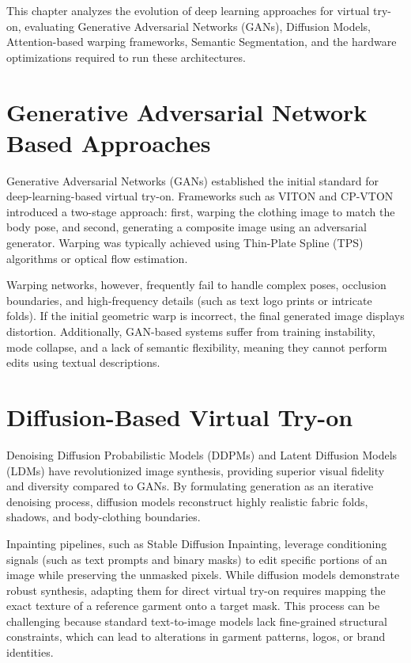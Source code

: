 \documentclass[12pt, a4paper]{report}
\begin{document}
This chapter analyzes the evolution of deep learning approaches for virtual try-on, evaluating Generative Adversarial Networks (GANs), Diffusion Models, Attention-based warping frameworks, Semantic Segmentation, and the hardware optimizations required to run these architectures.

\section{Generative Adversarial Network Based Approaches}

Generative Adversarial Networks (GANs) established the initial standard for deep-learning-based virtual try-on. Frameworks such as VITON and CP-VTON introduced a two-stage approach: first, warping the clothing image to match the body pose, and second, generating a composite image using an adversarial generator. Warping was typically achieved using Thin-Plate Spline (TPS) algorithms or optical flow estimation.

Warping networks, however, frequently fail to handle complex poses, occlusion boundaries, and high-frequency details (such as text logo prints or intricate folds). If the initial geometric warp is incorrect, the final generated image displays distortion. Additionally, GAN-based systems suffer from training instability, mode collapse, and a lack of semantic flexibility, meaning they cannot perform edits using textual descriptions.

\section{Diffusion-Based Virtual Try-on}

Denoising Diffusion Probabilistic Models (DDPMs) and Latent Diffusion Models (LDMs) have revolutionized image synthesis, providing superior visual fidelity and diversity compared to GANs. By formulating generation as an iterative denoising process, diffusion models reconstruct highly realistic fabric folds, shadows, and body-clothing boundaries.

Inpainting pipelines, such as Stable Diffusion Inpainting, leverage conditioning signals (such as text prompts and binary masks) to edit specific portions of an image while preserving the unmasked pixels. While diffusion models demonstrate robust synthesis, adapting them for direct virtual try-on requires mapping the exact texture of a reference garment onto a target mask. This process can be challenging because standard text-to-image models lack fine-grained structural constraints, which can lead to alterations in garment patterns, logos, or brand identities.
\end{document}
